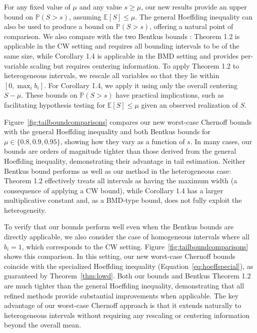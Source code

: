 \documentclass[12pt]{article}
\theoremstyle{plain}
\begin{document}
For any fixed value of $\mu$ and any value $s \geq \mu$, our new results provide an upper bound on $\mathbb{P}(S>s)$, assuming $\mathbb{E}[S]\leq \mu$.  The general Hoeffding inequality can also be used to produce a bound on $\mathbb{P}(S>s)$, offering a natural point of comparison.  We also compare with the two Bentkus bounds \citep{bentkus2004hoeffding}: Theorem 1.2 is applicable in the CW setting and requires all bounding intervals to be of the same size, while Corollary 1.4 is applicable in the BMD setting and provides per-variable scaling but requires centering information.  To apply Theorem 1.2 to heterogeneous intervals, we rescale all variables so that they lie within $[0, \max_i b_i]$.  For Corollary 1.4, we apply it using only the overall centering $S - \mu$.  These bounds on $\mathbb{P}(S>s)$ have practical implications, such as facilitating hypothesis testing for $\mathbb{E}[S]\leq \mu$ given an observed realization of $S$.

Figure~\ref{fig:tailboundcomparisons} compares our new worst-case Chernoff bounds with the general Hoeffding inequality and both Bentkus bounds for $\mu \in \{0.8, 0.9, 0.95\}$, showing how they vary as a function of $s$. In many cases, our bounds are orders of magnitude tighter than those derived from the general Hoeffding inequality, demonstrating their advantage in tail estimation.  Neither Bentkus bound performs as well as our method in the heterogeneous case: Theorem 1.2 effectively treats all intervals as having the maximum width (a consequence of applying a CW bound), while Corollary 1.4 has a larger multiplicative constant and, as a BMD-type bound, does not fully exploit the heterogeneity.

To verify that our bounds perform well even when the Bentkus bounds are directly applicable, we also consider the case of homogeneous intervals where all $b_i = 1$, which corresponds to the CW setting.  Figure~\ref{fig:tailboundcomparisons} shows this comparison.  In this setting, our new worst-case Chernoff bounds coincide with the specialized Hoeffding inequality (Equation~\ref{eq:hoeffspecial}), as guaranteed by Theorem~\ref{thm:lowd}.  Both our bounds and Bentkus Theorem 1.2 are much tighter than the general Hoeffding inequality, demonstrating that all refined methods provide substantial improvements when applicable.  The key advantage of our worst-case Chernoff approach is that it extends naturally to heterogeneous intervals without requiring any rescaling or centering information beyond the overall mean.
\end{document}
